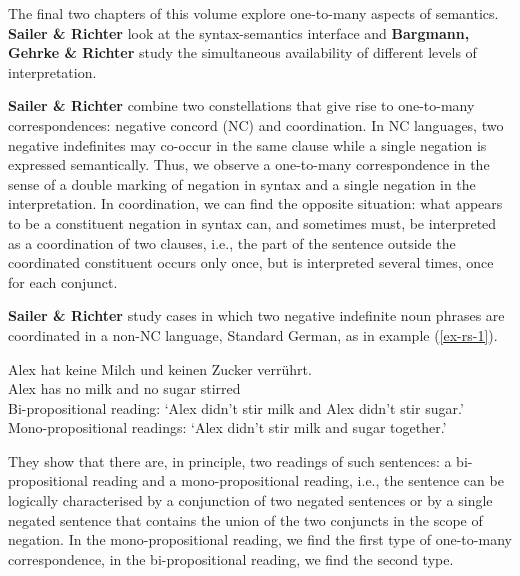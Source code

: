 \documentclass[output=paper]{langscibook}
\begin{document}
\begin{sloppypar}
  The final two chapters of this volume explore one-to-many aspects of
  semantics.  \textbf{Sailer \& Richter} look at the syntax-semantics
  interface and \textbf{Barg\-mann, Gehr\-ke \& Rich\-ter} study the
  simultaneous availability of different levels of interpretation.
\end{sloppypar}

\textbf{Sailer \& Richter} combine two constellations that give rise
to one-to-many correspondences: negative concord (NC) and
coordination.  In NC languages, two negative indefinites may co-occur
in the same clause while a single negation is expressed
semantically. Thus, we observe a one-to-many correspondence in
the sense of a double marking of negation in syntax and a single
negation in the interpretation.  In coordination, we can find the
opposite situation: what appears to be a constituent negation in
syntax can, and sometimes must, be interpreted as a coordination of
two clauses, i.e., the part of the sentence outside the coordinated
constituent occurs only once, but is interpreted several times, once
for each conjunct.

\textbf{Sailer \& Richter} study cases in which two negative indefinite noun phrases are coordinated in a non-NC language, Standard German, as in example (\ref{ex-rs-1}). 

\ea \label{ex-rs-1} 
\gll Alex hat keine Milch und keinen Zucker verrührt.\\
Alex has no milk and no sugar stirred\\
\glt Bi-propositional reading: `Alex didn't stir milk and Alex didn't stir sugar.'\\
     Mono-propositional readings: `Alex didn't stir milk and sugar together.'
\z 

They show that there are, in principle, two readings of such
sentences: a bi-propositional reading and a mono-propositional
reading, i.e., the sentence can be logically characterised by a conjunction of two
negated sentences or by a single negated sentence that contains the
union of the two conjuncts in the scope of negation.  In the
mono-propositional reading, we find the first type of one-to-many
correspondence, in the bi-propositional reading, we find the second
type.
\end{document}
